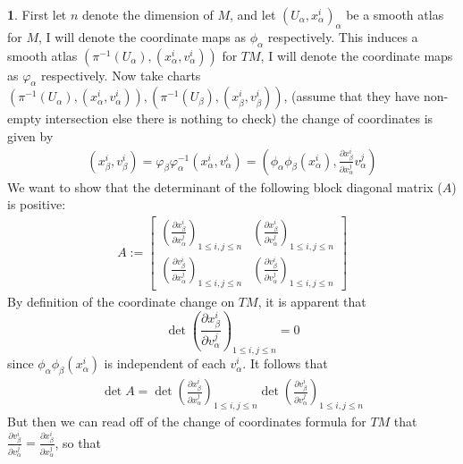 \documentclass[10.5pt]{article}
\theoremstyle{definition}
\newtheorem{pb}{}
\newcommand{\vp}{\varphi}
\begin{document}
    \begin{pb}
        First let \(n\) denote the dimension of \(M\), and let \((U_\alpha,x_\alpha^i)_\alpha\) be a smooth atlas for \(M\), I will denote the coordinate maps as \(\phi_\alpha\) respectively. This induces a smooth atlas \((\pi^{-1}(U_\alpha),(x_\alpha^i,v_\alpha^i))\) for \(TM\), I will denote the coordinate maps as \(\varphi_\alpha\) respectively. Now take charts \((\pi^{-1}(U_\alpha),(x_\alpha^i,v_\alpha^i)), (\pi^{-1}(U_\beta),(x_\beta^i,v_\beta^i))\), (assume that they have non-empty intersection else there is nothing to check) the change of coordinates is given by
        \begin{align*}
            (x_\beta^i,v_\beta^i) = \vp_\beta \vp_\alpha^{-1}(x_\alpha^i,v_\alpha^i) = (\phi_\alpha \phi_\beta(x_\alpha^i), \frac{\partial x_\beta^i}{\partial x_\alpha^j} v_\alpha^j)
        \end{align*}
        We want to show that the determinant of the following block diagonal matrix (\(A\)) is positive:
        \begin{align*}
            A := \begin{bmatrix} 
                \left(\frac{\partial x_\beta^i}{\partial x_\alpha^j} \right)_{1 \leq i,j \leq n} &
                \left(\frac{\partial x_\beta^i}{\partial v_\alpha^j} \right)_{1 \leq i,j \leq n} \\
                \left(\frac{\partial v_\beta^i}{\partial x_\alpha^j} \right)_{1 \leq i,j \leq n} &
                \left(\frac{\partial v_\beta^i}{\partial v_\alpha^j} \right)_{1 \leq i,j \leq n}
            \end{bmatrix}
        \end{align*}
        By definition of the coordinate change on \(TM\), it is apparent that
        \[\det \left(\frac{\partial x_\beta^i}{\partial v_\alpha^j} \right)_{1 \leq i,j \leq n} = 0\]
        since \(\phi_\alpha \phi_\beta(x_\alpha^i)\) is independent of each \(v_\alpha^i\).
        It follows that
        \begin{align*}
            \det A = \det \left(\frac{\partial x_\beta^i}{\partial x_\alpha^j} \right)_{1 \leq i,j \leq n} \det \left(\frac{\partial v_\beta^i}{\partial v_\alpha^j} \right)_{1 \leq i,j \leq n}
        \end{align*}
        But then we can read off of the change of coordinates formula for \(TM\) that
        \(\frac{\partial v_\beta^i}{\partial v_\alpha^j} = \frac{\partial x_\beta^i}{\partial x_\alpha^j}\), so that
        \begin{align*}

\end{align*}
\end{pb}
\end{document}
